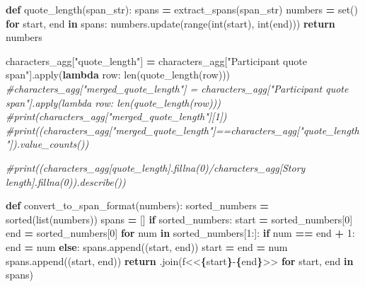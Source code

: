 \documentclass[
]{article}
\newenvironment{Shaded}{\begin{snugshade}}{\end{snugshade}}
\newcommand{\BuiltInTok}[1]{#1}
\newcommand{\CommentTok}[1]{\textcolor[rgb]{0.56,0.35,0.01}{\textit{#1}}}
\newcommand{\ControlFlowTok}[1]{\textcolor[rgb]{0.13,0.29,0.53}{\textbf{#1}}}
\newcommand{\DecValTok}[1]{\textcolor[rgb]{0.00,0.00,0.81}{#1}}
\newcommand{\KeywordTok}[1]{\textcolor[rgb]{0.13,0.29,0.53}{\textbf{#1}}}
\newcommand{\NormalTok}[1]{#1}
\newcommand{\OperatorTok}[1]{\textcolor[rgb]{0.81,0.36,0.00}{\textbf{#1}}}
\newcommand{\SpecialCharTok}[1]{\textcolor[rgb]{0.81,0.36,0.00}{\textbf{#1}}}
\newcommand{\SpecialStringTok}[1]{\textcolor[rgb]{0.31,0.60,0.02}{#1}}
\newcommand{\StringTok}[1]{\textcolor[rgb]{0.31,0.60,0.02}{#1}}
\begin{document}
\begin{Shaded}
\begin{Highlighting}[]
\KeywordTok{def}\NormalTok{ quote\_length(span\_str):}
\NormalTok{  spans }\OperatorTok{=}\NormalTok{ extract\_spans(span\_str)}
\NormalTok{  numbers }\OperatorTok{=} \BuiltInTok{set}\NormalTok{()}
  \ControlFlowTok{for}\NormalTok{ start, end }\KeywordTok{in}\NormalTok{ spans:}
\NormalTok{    numbers.update(}\BuiltInTok{range}\NormalTok{(}\BuiltInTok{int}\NormalTok{(start), }\BuiltInTok{int}\NormalTok{(end)))}
  \ControlFlowTok{return}\NormalTok{ numbers}

\NormalTok{characters\_agg[}\StringTok{"quote\_length"}\NormalTok{] }\OperatorTok{=}\NormalTok{ characters\_agg[}\StringTok{"Participant quote span"}\NormalTok{].}\BuiltInTok{apply}\NormalTok{(}\KeywordTok{lambda}\NormalTok{ row: }\BuiltInTok{len}\NormalTok{(quote\_length(row)))}
\CommentTok{\#characters\_agg["merged\_quote\_length"] = characters\_agg["Participant quote span"].apply(lambda row: len(quote\_length(row)))}
\CommentTok{\#print(characters\_agg["merged\_quote\_length"][1])}
\CommentTok{\#print((characters\_agg["merged\_quote\_length"]==characters\_agg["quote\_length"]).value\_counts())}

\CommentTok{\#print((characters\_agg[\textquotesingle{}quote\_length\textquotesingle{}].fillna(0)/characters\_agg[\textquotesingle{}Story length\textquotesingle{}].fillna(0)).describe())}


\KeywordTok{def}\NormalTok{ convert\_to\_span\_format(numbers):}
\NormalTok{    sorted\_numbers }\OperatorTok{=} \BuiltInTok{sorted}\NormalTok{(}\BuiltInTok{list}\NormalTok{(numbers))}
\NormalTok{    spans }\OperatorTok{=}\NormalTok{ []}
    \ControlFlowTok{if}\NormalTok{ sorted\_numbers:}
\NormalTok{        start }\OperatorTok{=}\NormalTok{ sorted\_numbers[}\DecValTok{0}\NormalTok{]}
\NormalTok{        end }\OperatorTok{=}\NormalTok{ sorted\_numbers[}\DecValTok{0}\NormalTok{]}
        \ControlFlowTok{for}\NormalTok{ num }\KeywordTok{in}\NormalTok{ sorted\_numbers[}\DecValTok{1}\NormalTok{:]:}
            \ControlFlowTok{if}\NormalTok{ num }\OperatorTok{==}\NormalTok{ end }\OperatorTok{+} \DecValTok{1}\NormalTok{:}
\NormalTok{                end }\OperatorTok{=}\NormalTok{ num}
            \ControlFlowTok{else}\NormalTok{:}
\NormalTok{                spans.append((start, end))}
\NormalTok{                start }\OperatorTok{=}\NormalTok{ end }\OperatorTok{=}\NormalTok{ num}
\NormalTok{        spans.append((start, end))}
    \ControlFlowTok{return} \StringTok{\textquotesingle{} \textquotesingle{}}\NormalTok{.join(}\SpecialStringTok{f\textquotesingle{}\textless{}\textless{}}\SpecialCharTok{\{}\NormalTok{start}\SpecialCharTok{\}}\SpecialStringTok{{-}}\SpecialCharTok{\{}\NormalTok{end}\SpecialCharTok{\}}\SpecialStringTok{\textgreater{}\textgreater{}\textquotesingle{}} \ControlFlowTok{for}\NormalTok{ start, end }\KeywordTok{in}\NormalTok{ spans)}


\end{Highlighting}
\end{Shaded}
\end{document}
